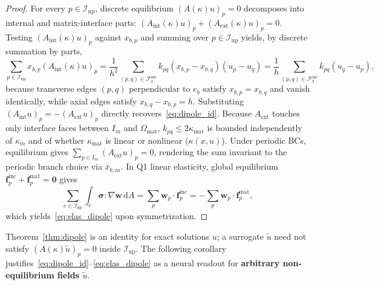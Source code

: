 \documentclass[preprint,11pt]{elsarticle}
\begin{document}
\begin{proof}
For every $p \in \mathcal{I}_{\mathrm{np}}$, discrete equilibrium $(A(\kappa) u)_p = 0$ decomposes into internal and matrix-interface parts: $(A_{\mathrm{int}}(\kappa) u)_p + (A_{\mathrm{ext}}(\kappa) u)_p = 0$. Testing $(A_{\mathrm{int}}(\kappa) u)_p$ against $x_{b,p}$ and summing over $p \in \mathcal{I}_{\mathrm{np}}$ yields, by discrete summation by parts,
\[
  \sum_{p \in \mathcal{I}_{\mathrm{np}}} x_{b,p} (A_{\mathrm{int}}(\kappa) u)_p
  = \frac{1}{h^2} \sum_{(p,q) \in \mathcal{F}_b^{\mathrm{inc}}} k_{pq}(x_{b,p} - x_{b,q})(u_p - u_q)
  = \frac{1}{h} \sum_{(p,q) \in \mathcal{F}_b^{\mathrm{inc}}} k_{pq}(u_q - u_p),
\]
because transverse edges $(p, q)$ perpendicular to $e_b$ satisfy $x_{b,p} = x_{b,q}$ and vanish identically, while axial edges satisfy $x_{b,q} - x_{b,p} = h$. Substituting $(A_{\mathrm{int}} u)_p = -(A_{\mathrm{ext}} u)_p$ directly recovers~\eqref{eq:dipole_id}. Because $A_{\mathrm{ext}}$ touches only interface faces between $I_m$ and $\Omega_{\mathrm{mat}}$, $k_{pq} \le 2\kappa_{\mathrm{mat}}$ is bounded independently of $\kappa_m$ and of whether $\kappa_{\mathrm{mat}}$ is linear or nonlinear ($\kappa(x, u)$). Under periodic BCs, equilibrium gives $\sum_{p \in I_m} (A_{\mathrm{ext}} u)_p = 0$, rendering the sum invariant to the periodic branch choice via $\bar x_{b,m}$. In Q1 linear elasticity, global equilibrium $\bm{f}^{\mathrm{inc}}_p + \bm{f}^{\mathrm{mat}}_p = \bm{0}$ gives
\[
  \sum_{e\in\mathcal{I}_{\mathrm{np}}} \int_e \bm{\sigma} : \nabla \bm{w}\, \mathrm{d}A = \sum_p \bm{w}_p \cdot \bm{f}^{\mathrm{inc}}_p = -\sum_p \bm{w}_p \cdot \bm{f}^{\mathrm{mat}}_p,
\]
which yields~\eqref{eq:elas_dipole} upon symmetrization.
\end{proof}

Theorem~\ref{thm:dipole} is an identity for exact solutions $u$; a surrogate $\tilde u$ need not satisfy $(A(\kappa)\tilde u)_p = 0$ inside $\mathcal{I}_{\mathrm{np}}$. The following corollary justifies~\eqref{eq:dipole_id}--\eqref{eq:elas_dipole} as a neural readout for \textbf{arbitrary non-equilibrium fields $\tilde u$}.
\end{document}
